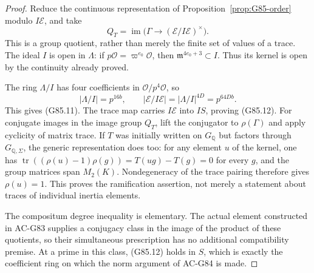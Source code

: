 \begin{proof}
Reduce the continuous representation of
Proposition~\ref{prop:G85-order} modulo \(I\mathcal E\), and take
\[
 Q_T=\operatorname{im}\bigl(
       \Gamma\longrightarrow(\mathcal E/I\mathcal E)^\times
                          \bigr).
\]
This is a group quotient, rather than merely the finite set of
values of a trace.
The ideal \(I\) is open in \(\Lambda\): if
\(p\mathcal O=\varpi^{e_0}\mathcal O\), then
\(\mathfrak m^{4e_0+3}\subset I\).
Thus its kernel is open by the continuity already proved.

The ring \(\Lambda/I\) has four coefficients in
\(\mathcal O/p^4\mathcal O\), so
\[
 |\Lambda/I|=p^{16b},\qquad
 |\mathcal E/I\mathcal E|
     =|\Lambda/I|^{4D}=p^{64Db}.
\]
This gives (G85.11).
The trace map carries \(I\mathcal E\) into \(IS\), proving
(G85.12). For conjugate images in the image group \(Q_T\), lift the
conjugator to \(\rho(\Gamma)\) and apply cyclicity of matrix trace.
If \(T\) was initially written on \(G_{\mathbb Q}\) but factors
through \(G_{\mathbb Q,\Sigma}\), the generic representation does too:
for any element \(u\) of the kernel, one has
\(\operatorname{tr}((\rho(u)-1)\rho(g))=T(ug)-T(g)=0\)
for every \(g\), and the group matrices span \(M_2(K)\).
Nondegeneracy of the trace pairing therefore gives \(\rho(u)=1\).
This proves the ramification assertion, not merely a statement about
traces of individual inertia elements.

The compositum degree inequality is elementary.
The actual element constructed in AC-G83 supplies a conjugacy class
in the image of the product of these quotients, so their simultaneous
prescription has no additional compatibility premise.
At a prime in this class, (G85.12) holds in \(S\), which is exactly
the coefficient ring on which the norm argument of AC-G84 is made.
\end{proof}


